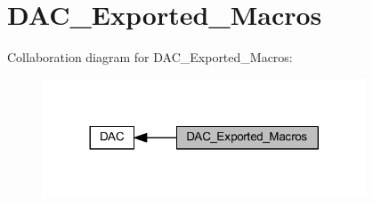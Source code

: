 \hypertarget{group___d_a_c___exported___macros}{}\section{D\+A\+C\+\_\+\+Exported\+\_\+\+Macros}
\label{group___d_a_c___exported___macros}
Collaboration diagram for D\+A\+C\+\_\+\+Exported\+\_\+\+Macros\+:
\nopagebreak
\begin{figure}[H]
\begin{center}
\leavevmode
\includegraphics[width=272pt]{group___d_a_c___exported___macros}
\end{center}
\end{figure}
